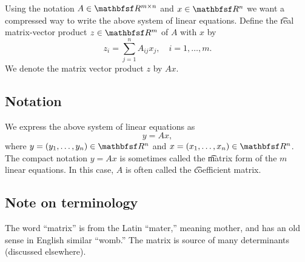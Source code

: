 Using the notation $A \in \R ^{m \times  n}$ and $x \in \R ^n$ we want a compressed way to write the above system of linear equations.
Define the \t{real matrix-vector product} $z \in \R ^m$ of $A$ with $x$ by
\[
z_{i} = \sum_{j = 1}^{n} A_{ij}x_j, \quad i = 1, \dots , m.
\]
We denote the matrix vector product $z$ by $Ax$.

\subsection*{Notation}

We express the above system of linear equations as
\[
y = Ax,
\]
where $y = (y_1, \dots , y_n) \in \R ^{n}$ and $x = (x_1, \dots , x_n) \in \R ^n$.
The compact notation $y = Ax$ is sometimes called the \t{matrix form} of the $m$ linear equations.
In this case, $A$ is often called the \t{coefficient matrix}.

\subsection*{Note on terminology}

The word ``matrix'' is from the Latin ``mater,'' meaning mother, and has an old sense in English similar ``womb.''
The matrix is source of many determinants (discussed elsewhere).

